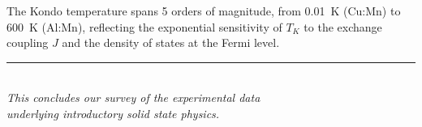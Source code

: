 The Kondo temperature spans 5 orders of magnitude, from \SI{0.01}{\kelvin} (Cu:Mn) to \SI{600}{\kelvin} (Al:Mn), reflecting the exponential sensitivity of $T_K$ to the exchange coupling $J$ and the density of states at the Fermi level.

\vspace{2cm}
\begin{center}
\rule{0.5\textwidth}{0.4pt}\\[0.5cm]
{\large\itshape This concludes our survey of the experimental data\\
underlying introductory solid state physics.}
\end{center}
